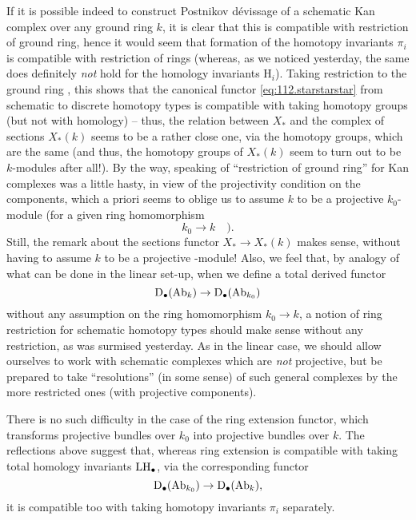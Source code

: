 If it is possible indeed to construct Postnikov dévissage
of a schematic Kan complex over any ground ring $k$, it is clear that
this is compatible with restriction of ground ring, hence it would
seem that formation of the homotopy invariants $\pi_i$ is compatible
with restriction of rings (whereas, as we noticed yesterday, the same
does definitely \emph{not} hold for the homology invariants $\mathrm
H_i$). Taking restriction to the ground ring \bZ, this shows that the
canonical functor \eqref{eq:112.starstarstar} from schematic to
discrete homotopy types is compatible with taking homotopy groups (but
not with homology) -- thus, the relation between $X_*$ and the complex
of sections $X_*(k)$ seems to be a rather close one, via the homotopy
groups, which are the same (and thus, the homotopy groups of $X_*(k)$
seem to turn out to be $k$-modules after all!). By the way, speaking
of ``restriction of ground ring'' for Kan complexes was a little
hasty, in view of the projectivity condition on the components, which
a priori seems to oblige us to assume $k$ to be a projective
$k_0$-module (for a given ring homomorphism
\[k_0\to k\quad\text{).}\]
Still, the remark about the sections functor $X_*\to X_*(k)$ makes
sense, without having to assume $k$ to be a projective \bZ-module!
Also, we feel that, by analogy of what can be done in the linear
set-up, when we define a total derived functor
\[{\mathrm{D}}_\bullet(\operatorname{Ab}_k) \to {\ensuremath{\mathrm{D}}}_\bullet(\operatorname{Ab}_{k_0})\]
without any assumption on the ring homomorphism $k_0\to k$, a notion
of ring restriction for schematic homotopy types should make sense
without any restriction, as was surmised yesterday. As in the linear
case, we should allow ourselves to work with schematic complexes which
are \emph{not} projective, but be prepared to take ``resolutions'' (in
some sense) of such general complexes by the more restricted ones
(with projective components).

There is no such difficulty in the case of the ring extension functor,
which transforms projective bundles over $k_0$ into projective bundles
over $k$. The reflections above suggest that, whereas ring extension
is compatible with taking total homology invariants $\operatorname{LH}_\bullet$, via
the corresponding functor
\[{\mathrm{D}}_\bullet(\operatorname{Ab}_{k_0}) \to {\ensuremath{\mathrm{D}}}_\bullet(\operatorname{Ab}_k),\]
it is compatible too with taking homotopy invariants $\pi_i$
separately.

\bigbreak

\noindent\hfill{}\par

